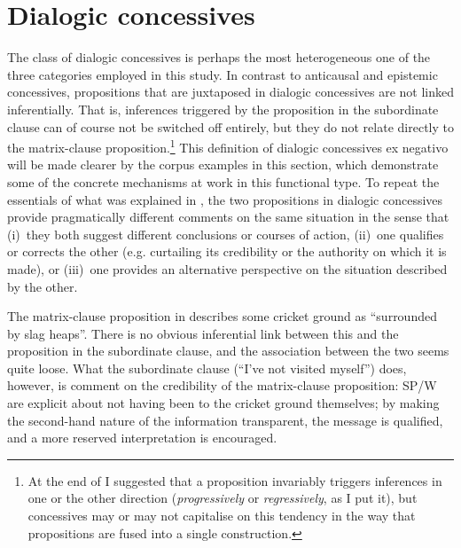 \section{\label{bkm:Ref487180775}Dialogic concessives}\label{sec:3.3}
\begin{sloppypar}
The class of dialogic concessives is perhaps the most heterogeneous one of the three categories employed in this study. In contrast to anticausal and epistemic concessives, propositions that are juxtaposed in dialogic concessives are not linked inferentially. That is, inferences triggered by the proposition in the subordinate clause can of course not be switched off entirely, but they do not relate directly to the matrix-clause proposition.\footnote{At the end of  I suggested that a proposition invariably triggers inferences in one or the other direction (\textit{progressively} or \textit{regressively}, as I put it), but concessives may or may not capitalise on this tendency in the way that propositions are fused into a single construction.} This definition of dialogic concessives ex negativo will be made clearer by the corpus examples in this section, which demonstrate some of the concrete mechanisms at work in this functional type. To repeat the essentials of what was explained in , the two propositions in dialogic concessives provide pragmatically different comments on the same situation in the sense that
(i)~they both suggest different conclusions or courses of action,
(ii)~one qualifies or corrects the other (e.g. curtailing its credibility or the authority on which it is made), or
(iii)~one provides an alternative perspective on the situation described by the other.
\end{sloppypar}

The matrix-clause proposition in  describes some cricket ground as “surrounded by slag heaps”. There is no obvious inferential link between this and the proposition in the subordinate clause, and the association between the two seems quite loose. What the subordinate clause (“I’ve not visited myself”) does, however, is comment on the credibility of the matrix-clause proposition: SP/W are explicit about not having been to the cricket ground themselves; by making the second-hand nature of the information transparent, the message is qualified, and a more reserved interpretation is encouraged.

